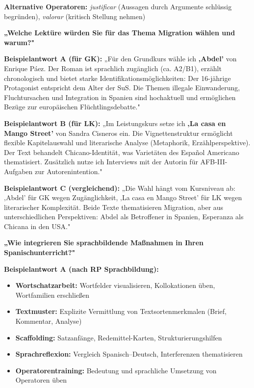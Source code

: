 \documentclass[11pt,a4paper]{article}
\begin{document}
\textbf{Alternative Operatoren:} \textit{justificar} (Aussagen durch Argumente schlüssig begründen), \textit{valorar} (kritisch Stellung nehmen)

\vspace{0.4cm}

\begin{exambox}
\textbf{„Welche Lektüre würden Sie für das Thema Migration wählen und warum?"}
\end{exambox}

\textbf{Beispielantwort A (für GK):}
„Für den Grundkurs wähle ich \textbf{‚Abdel'} von Enrique Páez. Der Roman ist sprachlich zugänglich (ca. A2/B1), erzählt chronologisch und bietet starke Identifikationsmöglichkeiten: Der 16-jährige Protagonist entspricht dem Alter der SuS. Die Themen illegale Einwanderung, Fluchtursachen und Integration in Spanien sind hochaktuell und ermöglichen Bezüge zur europäischen Flüchtlingsdebatte."

\textbf{Beispielantwort B (für LK):}
„Im Leistungskurs setze ich \textbf{‚La casa en Mango Street'} von Sandra Cisneros ein. Die Vignettenstruktur ermöglicht flexible Kapitelauswahl und literarische Analyse (Metaphorik, Erzählperspektive). Der Text behandelt Chicano-Identität, was Varietäten des Español Americano thematisiert. Zusätzlich nutze ich Interviews mit der Autorin für AFB-III-Aufgaben zur Autorenintention."

\textbf{Beispielantwort C (vergleichend):}
„Die Wahl hängt vom Kursniveau ab: ‚Abdel' für GK wegen Zugänglichkeit, ‚La casa en Mango Street' für LK wegen literarischer Komplexität. Beide Texte thematisieren Migration, aber aus unterschiedlichen Perspektiven: Abdel als Betroffener in Spanien, Esperanza als Chicana in den USA."

\vspace{0.4cm}

\begin{exambox}
\textbf{„Wie integrieren Sie sprachbildende Maßnahmen in Ihren Spanischunterricht?"}
\end{exambox}

\textbf{Beispielantwort A (nach RP Sprachbildung):}
\begin{itemize}[leftmargin=0.5cm, itemsep=1pt]
\item \textbf{Wortschatzarbeit:} Wortfelder visualisieren, Kollokationen üben, Wortfamilien erschließen
\item \textbf{Textmuster:} Explizite Vermittlung von Textsortenmerkmalen (Brief, Kommentar, Analyse)
\item \textbf{Scaffolding:} Satzanfänge, Redemittel-Karten, Strukturierungshilfen
\item \textbf{Sprachreflexion:} Vergleich Spanisch--Deutsch, Interferenzen thematisieren
\item \textbf{Operatorentraining:} Bedeutung und sprachliche Umsetzung von Operatoren üben
\end{itemize}
\end{document}
